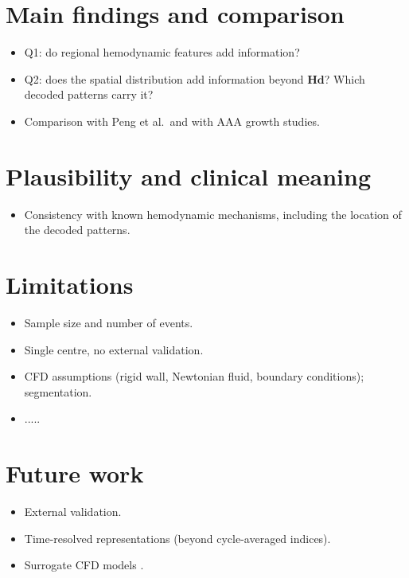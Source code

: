 \section{Main findings and comparison}
\begin{itemize}
    \item Q1: do regional hemodynamic features add information?
    \item Q2: does the spatial distribution add information beyond $\mathbf{Hd}$? Which decoded patterns carry it?
    \item Comparison with Peng et al.\ and with AAA growth studies.  \cite{forneris_ai-powered_2023, kim_deep_2023}
\end{itemize}

\section{Plausibility and clinical meaning}
\begin{itemize}
    \item Consistency with known hemodynamic mechanisms, including the location of the decoded patterns.
\end{itemize}

\section{Limitations}
\begin{itemize}
    \item Sample size and number of events.
    \item Single centre, no external validation.
    \item CFD assumptions (rigid wall, Newtonian fluid, boundary conditions); segmentation.
    \item ..... 
\end{itemize}

\section{Future work}
\begin{itemize}
    \item External validation.
    \item Time-resolved representations (beyond cycle-averaged indices).
    \item Surrogate CFD models \cite{faisal_rapid_2025}.
\end{itemize}
